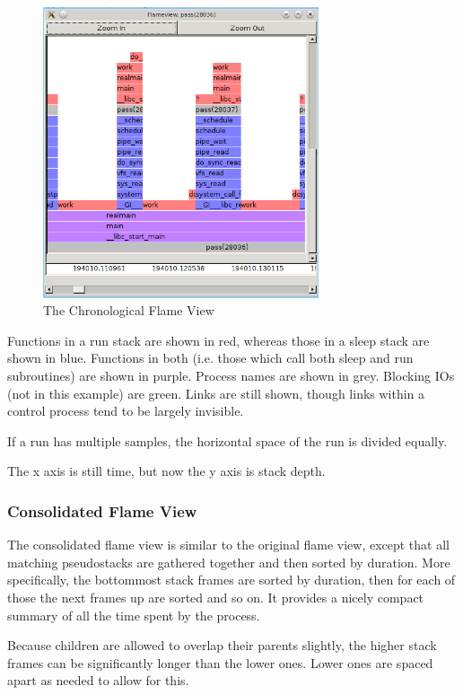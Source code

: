 \documentclass[10pt]{article}
\begin{document}
\begin{figure}[h!]
\includegraphics[width=3.2in]{images/flameshot}
\caption{The Chronological Flame View}
\end{figure}

Functions in a run stack are shown in red, whereas those in a sleep stack are shown in blue.  Functions in both (i.e. those which call both sleep and run subroutines) are shown in purple. Process names are shown in grey.  Blocking IOs (not in this example) are green.  Links are still shown, though links within a control process tend to be largely invisible.

If a run has multiple samples, the horizontal space of the run is divided equally.

The x axis is still time, but now the y axis is stack depth.

\subsubsection{Consolidated Flame View}

The consolidated flame view is similar to the original flame view, except that all matching pseudostacks are gathered together and then sorted by duration.  More specifically, the bottommost stack frames are sorted by duration, then for each of those the next frames up are sorted and so on.  It provides a nicely compact summary of all the time spent by the process.

Because children are allowed to overlap their parents slightly, the higher stack frames can be significantly longer than the lower ones.  Lower ones are spaced apart as needed to allow for this.
\end{document}
